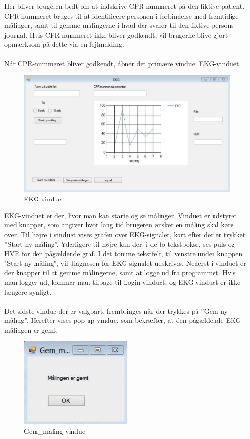 Her bliver brugeren bedt om at indskrive CPR-nummeret på den fiktive patient. CPR-nummeret bruges til at identificere personen i forbindelse med fremtidige målinger, samt til gemme målingerne i hvad der svarer til den fiktive persons journal. Hvis CPR-nummeret ikke bliver godkendt, vil brugerne blive gjort opmærksom på dette via en fejlmelding. 
\\
\\
Når CPR-nummeret bliver godkendt, åbner det primære vindue, EKG-vinduet. 

\begin{figure}[H]
	\centering
	\includegraphics[width=1\textwidth]{Figurer/Snip20150430_40}
	\caption{EKG-vindue}
\end{figure}

EKG-vinduet er der, hvor man kan starte og se målinger. Vinduet er udstyret med knapper, som angiver hvor lang tid brugeren ønsker en måling skal køre over. Til højre i vinduet vises grafen over EKG-signalet, kort efter der er trykket ”Start ny måling”. Yderligere til højre kan der, i de to tekstbokse, ses puls og HVR for den pågældende graf. I det tomme tekstfelt, til venstre under knappen "Start ny måling", vil diagnosen for EKG-signalet udskrives. Nederst i vinduet er der knapper til at gemme målingerne, samt at logge ud fra programmet. Hvis man logger ud, kommer man tilbage til Login-vinduet, og EKG-vinduet er ikke længere synligt. 
\\
\\
Det sidste vindue der er valgbart, frembringes når der trykkes på ”Gem ny måling”. Herefter vises pop-up vindue, som bekræfter, at den pågældende EKG-målingen er gemt. 

\begin{figure}[H]
	\centering
	\includegraphics[width=0.5\textwidth]{Figurer/Snip20150430_41}
	\caption{Gem\_måling-vindue}
\end{figure}


